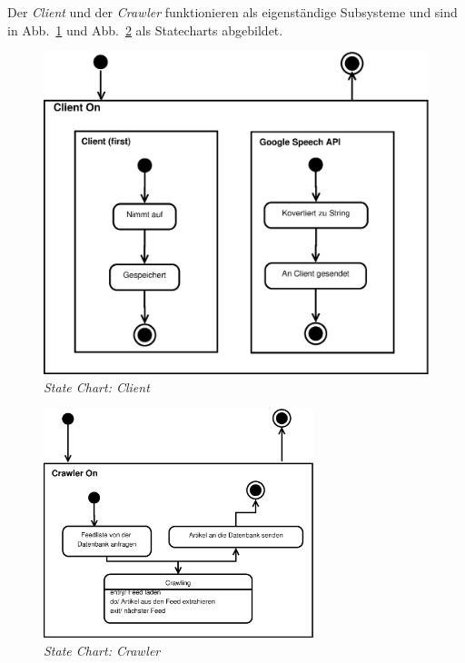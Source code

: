 Der \textit{Client} und der \textit{Crawler} funktionieren als eigenständige Subsysteme und sind in Abb.~\ref{fig:client_chart} und Abb.~\ref{fig:crawler_chart} als Statecharts abgebildet.

\begin{figure}
\centering
\includegraphics[width=.7\textwidth]{figures/client_chart.eps}
\caption{\textit{State Chart: Client}}
\label{fig:client_chart}
\end{figure}

\begin{figure}
\centering
\includegraphics[width=0.7\textwidth]{figures/crawler_chart.eps}
\caption{\textit{State Chart: Crawler}}
\label{fig:crawler_chart}
\end{figure}


